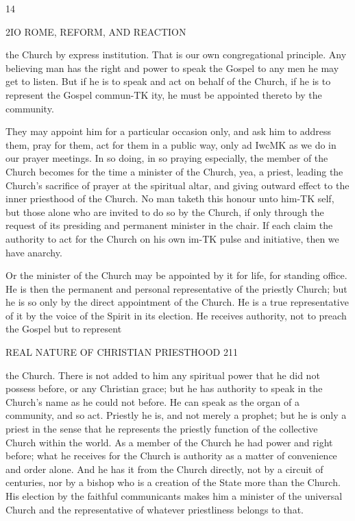\documentclass[12pt,a5paper,oneside]{book}
\begin{document}
{{14 



2IO ROME, REFORM, AND REACTION 

the Church by express institution. That is our own 
congregational principle. Any believing man has the 
right and power to speak the Gospel to any men he may 
get to listen. But if he is to speak and act on behalf 
of the Church, if he is to represent the Gospel commun-TK
ity, he must be appointed thereto by the community. 

They may appoint him for a particular occasion 
only, and ask him to address them, pray for them, act 
for them in a public way, only ad IwcMK as we do in 
our prayer meetings. In so doing, in so praying 
especially, the member of the Church becomes for the 
time a minister of the Church, yea, a priest, leading 
the Church's sacrifice of prayer at the spiritual altar, 
and giving outward effect to the inner priesthood of 
the Church. No man taketh this honour unto him-TK
self, but those alone who are invited to do so by the 
Church, if only through the request of its presiding 
and permanent minister in the chair. If each claim 
the authority to act for the Church on his own im-TK
pulse and initiative, then we have anarchy. 

Or the minister of the Church may be appointed 
by it for life, for standing office. He is then the 
permanent and personal representative of the priestly 
Church; but he is so only by the direct appointment 
of the Church. He is a true representative of it by 
the voice of the Spirit in its election. He receives 
authority, not to preach the Gospel but to represent 



REAL NATURE OF CHRISTIAN PRIESTHOOD 211 

the Church. There is not added to him any spiritual 
power that he did not possess before, or any Christian 
grace; but he has authority to speak in the Church's 
name as he could not before. He can speak as the 
organ of a community, and so act. Priestly he is, and 
not merely a prophet; but he is only a priest in the 
sense that he represents the priestly function of the 
collective Church within the world. As a member 
of the Church he had power and right before; what 
he receives for the Church is authority as a matter of 
convenience and order alone. And he has it from the 
Church directly, not by a circuit of centuries, nor by 
a bishop who is a creation of the State more than the 
Church. His election by the faithful communicants 
makes him a minister of the universal Church and 
the representative of whatever priestliness belongs to 
that. 

}}
\end{document}
